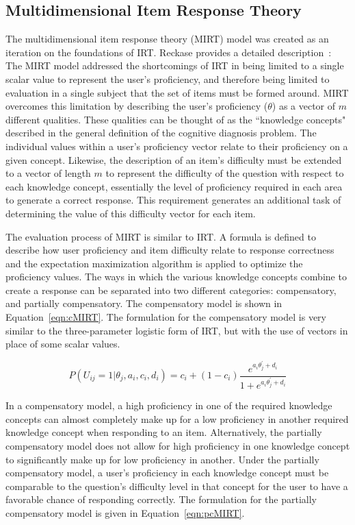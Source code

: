 \documentclass[letterpaper, 12pt, captions=tableabove]{scrreprt}
\begin{document}
		\subsection{Multidimensional Item Response Theory}
		\label{sub:MIRT}
			The multidimensional item response theory (MIRT) model was created as an iteration on the foundations of IRT. Reckase provides a detailed description~\cite{reckase2006}: The MIRT model addressed the shortcomings of IRT in being limited to a single scalar value to represent the user's proficiency, and therefore being limited to evaluation in a single subject that the set of items must be formed around. MIRT overcomes this limitation by describing the user's proficiency ($\theta$) as a vector of $m$ different qualities. These qualities can be thought of as the ``knowledge concepts" described in the general definition of the cognitive diagnosis problem. The individual values within a user's proficiency vector relate to their proficiency on a given concept. Likewise, the description of an item's difficulty must be extended to a vector of length $m$ to represent the difficulty of the question with respect to each knowledge concept, essentially the level of proficiency required in each area to generate a correct response. This requirement generates an additional task of determining the value of this difficulty vector for each item.

			The evaluation process of MIRT is similar to IRT. A formula is defined to describe how user proficiency and item difficulty relate to response correctness and the expectation maximization algorithm is applied to optimize the proficiency values. The ways in which the various knowledge concepts combine to create a response can be separated into two different categories: compensatory, and partially compensatory.  The compensatory model is shown in Equation~\ref{eqn:cMIRT}. The formulation for the compensatory model is very similar to the three-parameter logistic form of IRT, but with the use of vectors in place of some scalar values. 

			\begin{equation}
				\label{eqn:cMIRT}
				P(U_{ij} =1|\theta_j, a_i, c_i, d_i) = c_i + (1-c_i)\frac{e^{a_i\theta_j^{'}+d_i}}{1 + e^{a_i\theta_j^{'}+d_i}}
			\end{equation}

			In a compensatory model, a high proficiency in one of the required knowledge concepts can almost completely make up for a low proficiency in another required knowledge concept when responding to an item. Alternatively, the partially compensatory model does not allow for high proficiency in one knowledge concept to significantly make up for low proficiency in another. Under the partially compensatory model, a user's proficiency in each knowledge concept must be comparable to the question's difficulty level in that concept for the user to have a favorable chance of responding correctly. The formulation for the partially compensatory model is given in Equation~\ref{eqn:pcMIRT}.
\end{document}
